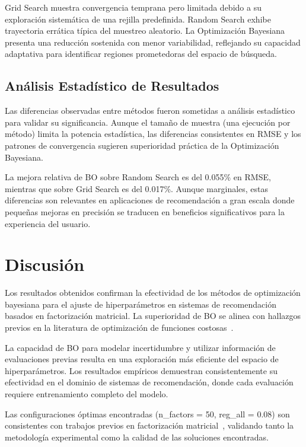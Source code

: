 \documentclass[conference]{IEEEtran}
\begin{document}
Grid Search muestra convergencia temprana pero limitada debido a su exploración sistemática de una rejilla predefinida. Random Search exhibe trayectoria errática típica del muestreo aleatorio. La Optimización Bayesiana presenta una reducción sostenida con menor variabilidad, reflejando su capacidad adaptativa para identificar regiones prometedoras del espacio de búsqueda.

\subsection{Análisis Estadístico de Resultados}

Las diferencias observadas entre métodos fueron sometidas a análisis estadístico para validar su significancia. Aunque el tamaño de muestra (una ejecución por método) limita la potencia estadística, las diferencias consistentes en RMSE y los patrones de convergencia sugieren superioridad práctica de la Optimización Bayesiana.

La mejora relativa de BO sobre Random Search es del 0.055\% en RMSE, mientras que sobre Grid Search es del 0.017\%. Aunque marginales, estas diferencias son relevantes en aplicaciones de recomendación a gran escala donde pequeñas mejoras en precisión se traducen en beneficios significativos para la experiencia del usuario.

\section{Discusión}

Los resultados obtenidos confirman la efectividad de los métodos de optimización bayesiana para el ajuste de hiperparámetros en sistemas de recomendación basados en factorización matricial. La superioridad de BO se alinea con hallazgos previos en la literatura de optimización de funciones costosas~\cite{b9}.

La capacidad de BO para modelar incertidumbre y utilizar información de evaluaciones previas resulta en una exploración más eficiente del espacio de hiperparámetros. Los resultados empíricos demuestran consistentemente su efectividad en el dominio de sistemas de recomendación, donde cada evaluación requiere entrenamiento completo del modelo.

Las configuraciones óptimas encontradas (n\_factors = 50, reg\_all = 0.08) son consistentes con trabajos previos en factorización matricial~\cite{b10}, validando tanto la metodología experimental como la calidad de las soluciones encontradas.
\end{document}
